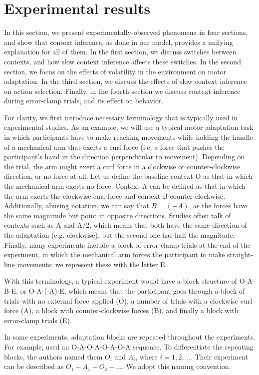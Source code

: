\documentclass[a4paper,doc,floatsintext,natbib]{apa6}
\begin{document}
\section{Experimental results}
In this section, we present experimentally-observed phenomena in four sections, and show that context inference, as done in our model, provides a unifying explanation for all of them. In the first section, we discuss switches between contexts, and how slow context inference affects these switches. In the second section, we focus on the effects of volatility in the environment on motor adaptation. In the third section, we discuss the effects of slow context inference on action selection. Finally, in the fourth section we discuss context inference during error-clamp trials, and its effect on behavior.

For clarity, we first introduce necessary terminology that is typically used in experimental studies. As an example, we will use a typical motor adaptation task in which participants have to make reaching movements while holding the handle of a mechanical arm that exerts a curl force (i.e. a force that pushes the participant's hand in the direction perpendicular to movement). Depending on the trial, the arm might exert a curl force in a clockwise or counter-clockwise direction, or no force at all. Let us define the baseline context O as that in which the mechanical arm exerts no force. Context A can be defined as that in which the arm exerts the clockwise curl force and context B counter-clockwise. Additionally, abusing notation, we can say that $B = (-A)$, as the forces have the same magnitude but point in opposite directions. Studies often talk of contexts such as A and A/2, which means that both have the same direction of the adaptation (e.g. clockwise), but the second one has half the magnitude. Finally, many experiments include a block of error-clamp trials at the end of the experiment, in which the mechanical arm forces the participant to make straight-line movements; we represent these with the letter E.

With this terminology, a typical experiment \cite[e.g.][]{Ethier_Spontaneous_2008} would have a block structure of O-A-B-E, or O-A-(-A)-E, which means that the participant goes through a block of trials with no external force applied (O), a number of trials with a clockwise curl force (A), a block with counter-clockwise forces (B), and finally a block with error-clamp trials (E).

In some experiments, adaptation blocks are repeated throughout the experiments. For example, \cite{Oh_Minimizing_2019} used an O-A-O-A-O-A-O-A sequence. To differentiate the repeating blocks, the authors named them $O_i$ and $A_i$, where $i = 1, 2, ...$. Their experiment can be described as $O_1-A_1-O_2-...$. We adopt this naming convention.
\end{document}
